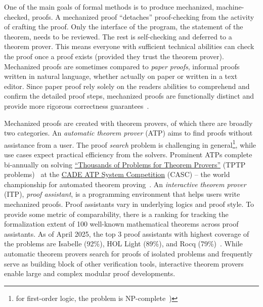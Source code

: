 One of the main goals of formal methods is to produce mechanized, \ie machine-checked, proofs.
A mechanized proof \enquote{detaches} proof-checking from the activity of crafting the proof.
Only the interface of the program, \ie the statement of the theorem, needs to be reviewed.
The rest is self-checking and deferred to a theorem prover.
This means everyone with sufficient technical abilities can check the proof once a proof exists (provided they trust the theorem prover).
Mechanized proofs are sometimes compared to \emph{paper proofs}, \ie informal proofs written in natural language, whether actually on paper or written in a text editor.
Since paper proof rely solely on the readers abilities to comprehend and confirm the detailed proof steps, mechanized proofs are functionally distinct and provide more rigorous correctness guarantees~\cite{gonthier2008}.

Mechanized proofs are created with theorem provers, of which there are broadly two categories.
An \emph{automatic theorem prover} (ATP) aims to find proofs without assistance from a user.
The proof \emph{search} problem is challenging in general\footnote{\Eg for first-order logic, the problem is NP-complete~\cite{cook1971, levin1973})}, while use cases expect practical efficiency from the solvers.
Prominent ATPs complete bi-annually on solving \href{https://www.tptp.org/}{\enquote{Thousands of Problems for Theorem Provers}} (TPTP problems)~\cite{sutcliffe2024} at the \href{https://tptp.org/CASC/}{CADE ATP System Competition} (CASC) --
the world championship for automated theorem proving~\cite{casc}.
An \emph{interactive theorem prover} (ITP), \aka \emph{proof assistant}, is a programming environment that helps users write mechanized proofs.
Proof assistants vary in underlying logics and proof style.
To provide some metric of comparability, there is a ranking for tracking the formalization extent of 100 well-known mathematical theorems across proof assistants.
As of April 2025, the top 3 proof assistants with highest coverage of the problems are Isabelle (92\%), HOL Light (89\%), and Rocq (79\%)~\cite{hundredtheorems}.
While automatic theorem provers search for proofs of isolated problems and frequently serve as building block of other verification tools,
interactive theorem provers enable large and complex modular proof developments.

